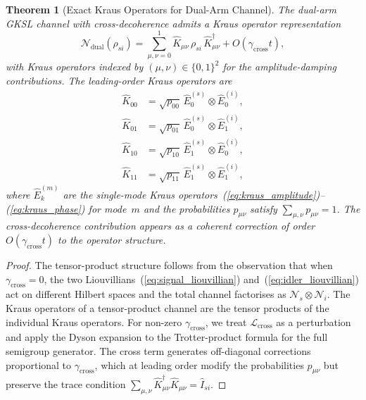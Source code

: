 \documentclass[journal]{IEEEtran}
\newtheorem{theorem}{Theorem}
\begin{document}
\begin{theorem}[Exact Kraus Operators for Dual-Arm Channel]\label{thm:dual_kraus}
The dual-arm GKSL channel with cross-decoherence admits a Kraus operator representation
\begin{equation}\label{eq:dual_kraus}
\mathcal{N}_{\text{dual}}(\rho_{si}) = \sum_{\mu,\nu=0}^{1} \hat{K}_{\mu\nu}\,\rho_{si}\,\hat{K}_{\mu\nu}^\dagger + O(\gamma_{\text{cross}}t),
\end{equation}
with Kraus operators indexed by $(\mu,\nu) \in \{0,1\}^2$ for the amplitude-damping contributions. The leading-order Kraus operators are
\begin{equation}\label{eq:kraus_explicit}
\begin{aligned}
\hat{K}_{00} &= \sqrt{p_{00}}\,\hat{E}_0^{(s)} \otimes \hat{E}_0^{(i)}, \\
\hat{K}_{01} &= \sqrt{p_{01}}\,\hat{E}_0^{(s)} \otimes \hat{E}_1^{(i)}, \\
\hat{K}_{10} &= \sqrt{p_{10}}\,\hat{E}_1^{(s)} \otimes \hat{E}_0^{(i)}, \\
\hat{K}_{11} &= \sqrt{p_{11}}\,\hat{E}_1^{(s)} \otimes \hat{E}_1^{(i)},
\end{aligned}
\end{equation}
where $\hat{E}_k^{(m)}$ are the single-mode Kraus operators~(\ref{eq:kraus_amplitude})--(\ref{eq:kraus_phase}) for mode~$m$ and the probabilities $p_{\mu\nu}$ satisfy $\sum_{\mu,\nu} p_{\mu\nu} = 1$. The cross-decoherence contribution appears as a coherent correction of order~$O(\gamma_{\text{cross}}t)$ to the operator structure.
\end{theorem}

\begin{proof}
The tensor-product structure follows from the observation that when $\gamma_{\text{cross}} = 0$, the two Liouvillians~(\ref{eq:signal_liouvillian}) and~(\ref{eq:idler_liouvillian}) act on different Hilbert spaces and the total channel factorises as $\mathcal{N}_s \otimes \mathcal{N}_i$. The Kraus operators of a tensor-product channel are the tensor products of the individual Kraus operators. For non-zero $\gamma_{\text{cross}}$, we treat $\mathcal{L}_{\text{cross}}$ as a perturbation and apply the Dyson expansion to the Trotter-product formula for the full semigroup generator. The cross term generates off-diagonal corrections proportional to $\gamma_{\text{cross}}$, which at leading order modify the probabilities $p_{\mu\nu}$ but preserve the trace condition $\sum_{\mu,\nu} \hat{K}_{\mu\nu}^\dagger\hat{K}_{\mu\nu} = \hat{I}_{si}$.
\end{proof}
\end{document}
